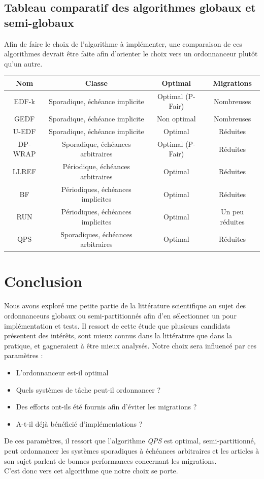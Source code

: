 \documentclass[11pt,a4paper,oneside]{report}
\begin{document}
\subsection{Tableau comparatif des algorithmes globaux et semi-globaux}
Afin de faire le choix de l'algorithme à implémenter, une comparaison de ces algorithmes 
devrait être faite afin d'orienter le choix vers un ordonnanceur plutôt qu'un autre. 

\vspace{1em}

\begin{tabular}{|c|c|c|c|}
    \hline
    \textbf{Nom} & \textbf{Classe} &  \textbf{Optimal} & \textbf{Migrations}\\
    \hline
    \hline
    EDF-k & Sporadique, échéance implicite & Optimal (P-Fair) & Nombreuses \\
    \hline
    GEDF & Sporadique, échéance implicite & Non optimal & Nombreuses \\
    \hline    
    U-EDF & Sporadique, échéance implicite  & Optimal & Réduites\\
    \hline
    DP-WRAP & Sporadique, échéances arbitraires & Optimal (P-Fair)& Réduites\\
    \hline
    LLREF & Périodique, échéances arbitraires & Optimal & Réduites \\
    \hline
    BF & Périodiques, échéances implicites & Optimal & Réduites \\
    \hline
    RUN & Périodiques, échéances implicites & Optimal & Un peu réduites\\
    \hline
    QPS & Sporadiques, échéances arbitraires & Optimal & Réduites\\
    \hline
    
\end{tabular}


\section{Conclusion}
Nous avons exploré une petite partie de la littérature scientifique au sujet des ordonnanceurs 
globaux ou semi-partitionnés afin d'en sélectionner un pour implémentation et tests. 
Il ressort de cette étude que plusieurs candidats présentent des intérêts, sont mieux 
connus dans la littérature que dans la pratique, et gagneraient à être mieux analysés. 
Notre choix sera influencé par ces paramètres : \\
\begin{itemize}
    \item L'ordonnanceur est-il optimal
    \item Quels systèmes de tâche peut-il ordonnancer ?
    \item Des efforts ont-ils été fournis afin d'éviter les migrations ?
    \item A-t-il déjà bénéficié d'implémentations ?
\end{itemize}
De ces paramètres, il ressort que l'algorithme \textit{QPS} est optimal, semi-partitionné, 
peut ordonnancer les systèmes sporadiques à échéances arbitraires et 
les articles à son sujet parlent de bonnes performances concernant les migrations. \\
C'est donc vers cet algorithme que notre choix se porte.




\end{document}
